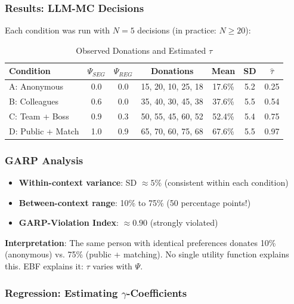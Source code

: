 \subsubsection{Results: LLM-MC Decisions}

Each condition was run with $N=5$ decisions (in practice: $N \geq 20$):

\begin{table}[htbp]
\centering
\caption{Observed Donations and Estimated $\tau$}
\label{tab:tau-results}
\renewcommand{\arraystretch}{1.3}
\begin{tabular}{@{}lcccccc@{}}
\toprule
\textbf{Condition} & $\Psi_{SEG}$ & $\Psi_{REG}$ & \textbf{Donations} & \textbf{Mean} & \textbf{SD} & $\hat{\tau}$ \\
\midrule
A: Anonymous & 0.0 & 0.0 & 15, 20, 10, 25, 18 & 17.6\% & 5.2 & 0.25 \\
B: Colleagues & 0.6 & 0.0 & 35, 40, 30, 45, 38 & 37.6\% & 5.5 & 0.54 \\
C: Team + Boss & 0.9 & 0.3 & 50, 55, 45, 60, 52 & 52.4\% & 5.4 & 0.75 \\
D: Public + Match & 1.0 & 0.9 & 65, 70, 60, 75, 68 & 67.6\% & 5.5 & 0.97 \\
\bottomrule
\end{tabular}
\end{table}

\subsubsection{GARP Analysis}

\begin{itemize}
\item \textbf{Within-context variance}: SD $\approx 5\%$ (consistent within each condition)
\item \textbf{Between-context range}: 10\% to 75\% (50 percentage points!)
\item \textbf{GARP-Violation Index}: $\approx 0.90$ (strongly violated)
\end{itemize}

\textbf{Interpretation}: The same person with identical preferences donates 10\% (anonymous) vs. 75\% (public + matching). No single utility function explains this. EBF explains it: $\tau$ varies with $\Psi$.

\subsubsection{Regression: Estimating $\gamma$-Coefficients}

